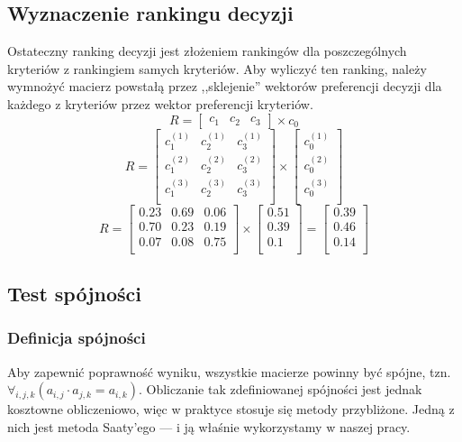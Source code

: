 \documentclass[a4paper,notitlepage]{article}
\begin{document}
\subsection{Wyznaczenie rankingu decyzji}
Ostateczny ranking decyzji jest złożeniem rankingów dla poszczególnych kryteriów z rankingiem samych kryteriów.
Aby wyliczyć ten ranking, należy wymnożyć macierz powstałą przez ,,sklejenie'' wektorów preferencji decyzji dla każdego z kryteriów przez wektor preferencji kryteriów.
\[ R = \left[ \begin{array}{ccc}	c_1	&	c_2	&	c_3 \end{array} \right] \times c_0 \]
\[
	R = \left[
		\begin{array}{ccc}
		c_{1}^{(1)}	&	c_{2}^{(1)}	&	c_{3}^{(1)}\\
		c_{1}^{(2)}	&	c_{2}^{(2)}	&	c_{3}^{(2)}\\
		c_{1}^{(3)}	&	c_{2}^{(3)}	&	c_{3}^{(3)}\\
		\end{array}
	\right]
	\times
	\left[
		\begin{array}{c}
		c_{0}^{(1)}\\
		c_{0}^{(2)}\\
		c_{0}^{(3)}\\
		\end{array}
	\right]
\]
\[
	R=
	\left[
	\begin{array}{ccc}
		0.23	&	0.69	&	0.06\\
		0.70	&	0.23	&	0.19\\
		0.07	&	0.08	&	0.75\\
	\end{array}
	\right]
	\times
	\left[
	\begin{array}{c}
		0.51\\
		0.39\\
		0.1\\
	\end{array}
	\right]
	=
	\left[
	\begin{array}{c}
		0.39\\
		0.46\\
		0.14\\
	\end{array}
	\right]
\]

\subsection{Test spójności}
\subsubsection{Definicja spójności}
Aby zapewnić poprawność wyniku, wszystkie macierze powinny być spójne, tzn. $\forall_{i,j,k} \left( a_{i,j} \cdot a_{j,k} = a_{i,k} \right)$.
Obliczanie tak zdefiniowanej spójności jest jednak kosztowne obliczeniowo, więc w praktyce stosuje się metody przybliżone.
Jedną z nich jest metoda Saaty'ego --- i ją właśnie wykorzystamy w naszej pracy.
\end{document}
